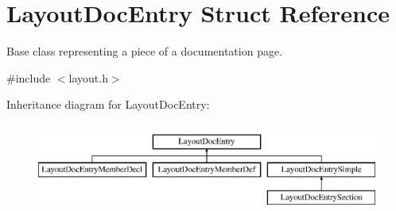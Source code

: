 \hypertarget{struct_layout_doc_entry}{}\section{Layout\+Doc\+Entry Struct Reference}
\label{struct_layout_doc_entry}


Base class representing a piece of a documentation page.  




{\ttfamily \#include $<$layout.\+h$>$}

Inheritance diagram for Layout\+Doc\+Entry\+:\begin{figure}[H]
\begin{center}
\leavevmode
\includegraphics[height=3.000000cm]{struct_layout_doc_entry}
\end{center}
\end{figure}
